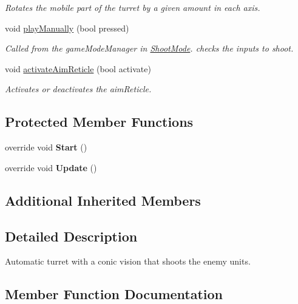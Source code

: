 \begin{DoxyCompactItemize}
\begin{DoxyCompactList}\small\item\em Rotates the mobile part of the turret by a given amount in each axis. \end{DoxyCompactList}\item 
void \mbox{\hyperlink{class_turret_mini_gun_a38e7de5216effbf5855e7e2f0fd27e08}{play\+Manually}} (bool pressed)
\begin{DoxyCompactList}\small\item\em Called from the game\+Mode\+Manager in \mbox{\hyperlink{class_shoot_mode}{Shoot\+Mode}}. checks the inputs to shoot. \end{DoxyCompactList}\item 
void \mbox{\hyperlink{class_turret_mini_gun_a7119ae1a159a7fde64f9cfd1b8a3c35f}{activate\+Aim\+Reticle}} (bool activate)
\begin{DoxyCompactList}\small\item\em Activates or deactivates the aim\+Reticle. \end{DoxyCompactList}\end{DoxyCompactItemize}
\subsection*{Protected Member Functions}
\begin{DoxyCompactItemize}
\item 
\mbox{\label{class_turret_mini_gun_af03f5877727b9a7fb3d3b48c4a359af4}} 
override void {\bfseries Start} ()
\item 
\mbox{\label{class_turret_mini_gun_aab4135ca9b906ccc31c31991edd4e0c6}} 
override void {\bfseries Update} ()
\end{DoxyCompactItemize}
\subsection*{Additional Inherited Members}


\subsection{Detailed Description}
Automatic turret with a conic vision that shoots the enemy units. 



\subsection{Member Function Documentation}
\mbox{\label{class_turret_mini_gun_a7119ae1a159a7fde64f9cfd1b8a3c35f}} 
